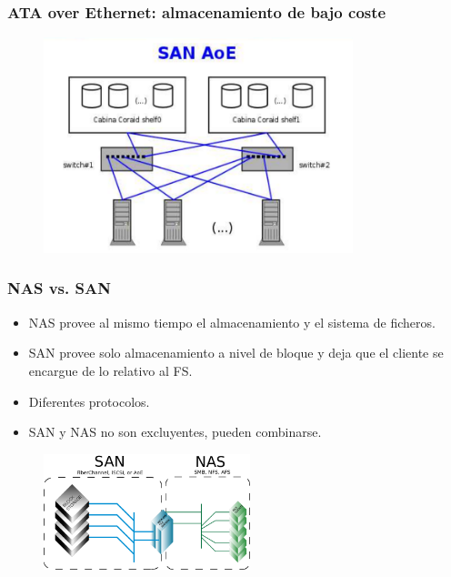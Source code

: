\documentclass{beamer}
\begin{document}
\begin{frame}
  \frametitle{ATA over Ethernet: almacenamiento de bajo coste}

\begin{figure}[h]
\begin{center}
  \includegraphics[width=9cm]{figs/san_aoe.png}
\end{center}
\end{figure}

\end{frame}


\begin{frame}
  \frametitle{NAS vs. SAN}
  \begin{itemize}
\small
    \item NAS provee al mismo tiempo el almacenamiento y el sistema de ficheros.
    \item SAN provee solo almacenamiento a nivel de bloque y deja que el cliente se encargue de lo relativo al FS.  
    \item Diferentes protocolos.
    \item SAN y NAS no son excluyentes, pueden combinarse.
  \end{itemize}

\normalsize

\begin{figure}[h]
\begin{center}
  \includegraphics[width=6cm]{figs/SANvsNAS.png}
\end{center}
\end{figure}

\end{frame}
\end{document}
